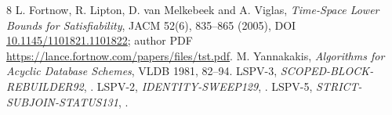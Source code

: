 \documentclass[11pt]{article}
\begin{document}
\begin{thebibliography}{8}
 L. Fortnow, R. Lipton, D. van Melkebeek and A. Viglas,
\emph{Time-Space Lower Bounds for Satisfiability}, JACM 52(6), 835--865
(2005), DOI \href{https://doi.org/10.1145/1101821.1101822}{10.1145/1101821.1101822};
author PDF \url{https://lance.fortnow.com/papers/files/tst.pdf}.
 M. Yannakakis, \emph{Algorithms for Acyclic Database
Schemes}, VLDB 1981, 82--94.
 LSPV-3, \emph{SCOPED-BLOCK-REBUILDER92},
.
 LSPV-2, \emph{IDENTITY-SWEEP129},
.
 LSPV-5, \emph{STRICT-SUBJOIN-STATUS131},
.
\end{thebibliography}
\end{document}
